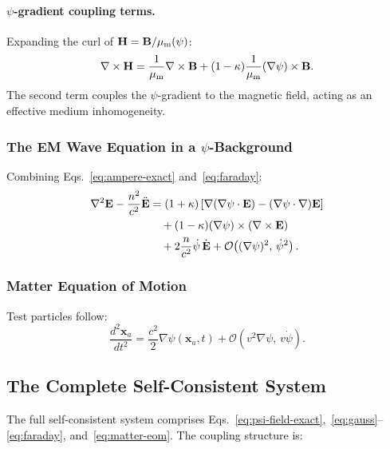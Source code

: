 \documentclass[aps,prd,twocolumn,superscriptaddress,floatfix,nofootinbib]{revtex4-2}
\newcommand{\kap}{\kappa}
\newcommand{\order}[1]{\mathcal{O}\!\left(#1\right)}
\begin{document}
\paragraph{$\psi$-gradient coupling terms.} Expanding the curl of
$\mathbf{H} = \mathbf{B}/\mu_{\rm m}(\psi)$:
\begin{equation}
\nabla\times\mathbf{H} = \frac{1}{\mu_{\rm m}}\nabla\times\mathbf{B}
+ (1-\kap)\frac{1}{\mu_{\rm m}}(\nabla\psi)\times\mathbf{B}.
\label{eq:curl-H-expanded}
\end{equation}
The second term couples the $\psi$-gradient to the magnetic field,
acting as an effective medium inhomogeneity.

\subsubsection{The EM Wave Equation in a $\psi$-Background}

Combining Eqs.~\eqref{eq:ampere-exact} and~\eqref{eq:faraday}:
\begin{align}
\nabla^2\mathbf{E} - \frac{n^2}{c^2}\ddot{\mathbf{E}} &=
(1+\kap)\left[\nabla(\nabla\psi\cdot\mathbf{E})
- (\nabla\psi\cdot\nabla)\mathbf{E}\right] \notag\\
&\quad + (1-\kap)(\nabla\psi)\times(\nabla\times\mathbf{E}) \notag\\
&\quad + 2\frac{n}{c^2}\dot\psi\,\dot{\mathbf{E}}
+ \order{(\nabla\psi)^2,\,\dot\psi^2}.
\label{eq:wave-exact}
\end{align}

\subsubsection{Matter Equation of Motion}

Test particles follow:
\begin{equation}
\frac{d^2\mathbf{x}_a}{dt^2} = \frac{c^2}{2}\nabla\psi(\mathbf{x}_a,t)
+ \order{v^2\nabla\psi,\,v\dot\psi}.
\label{eq:matter-eom}
\end{equation}

\subsection{The Complete Self-Consistent System}

The full self-consistent system comprises
Eqs.~\eqref{eq:psi-field-exact},~\eqref{eq:gauss}--\eqref{eq:faraday},
and~\eqref{eq:matter-eom}. The coupling structure is:
\end{document}
